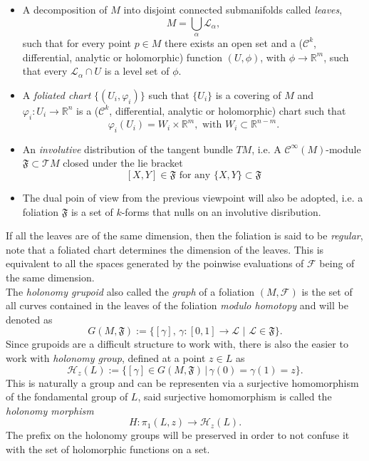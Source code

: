 \documentclass[12pt,twoside,a4paper]{report}
\newcommand{\re}{\ensuremath{\mathbb R }}
\begin{document}
\begin{itemize}
  \item A decomposition of $M$ into disjoint connected submanifolds called \emph{leaves},
        \[
          M=\bigcup_{\alpha}\mathcal{L_{\alpha}},
        \]
        \noindent such that for every point $p\in M$ there exists an open set and a ($\mathcal{C}^{k}$, differential, analytic or holomorphic) function $(U,\phi)$, with $\phi\rightarrow\re^{m}$, such that every $\mathcal{L}_{\alpha}\cap U$ is a level set of $\phi$.
  \item A \emph{foliated chart} $\{(U_{i},\varphi_{i})\}$ such that $\{U_{i}\}$ is a covering of $M$ and $\varphi_{i}:U_{i}\rightarrow\re^{n}$ is a ($\mathcal{C}^{k}$, differential, analytic or holomorphic) chart such that
        \[
          \varphi_{i}(U_{i})=W_{i}\times\re^{m},\text{ with }W_{i}\subset\re^{n-m}.
        \]
      \item An \emph{involutive} distribution of the tangent bundle $TM$, i.e. A $\mathcal{C}^{\infty}(M)$-module $\mathfrak{F}\subset\mathcal{T}M$ closed under the lie bracket
        \[
          [X,Y]\in\mathfrak{F}\text{ for any } \{X,Y\}\subset\mathfrak{F}
        \]
  \item The dual poin of view from the previous viewpoint will also be adopted, i.e. a foliation $\mathfrak{F}$ is a set of $k$-forms that nulls on an involutive disribution.
\end{itemize}
If all the leaves are of the same dimension, then the foliation is said to be \emph{regular}, note that a foliated chart determines the dimension of the leaves. This is equivalent to all the spaces generated by the poinwise evaluations of $\mathcal{F}$ being of the same dimension.\\

The \emph{holonomy grupoid} also called the \emph{graph} of a foliation $(M,\mathcal{F})$ is the set of all curves contained in the leaves of the foliation \textit{modulo homotopy} and will be denoted as 
\[
G(M,\mathfrak{F}):=\{[\gamma],\,\gamma:[0,1]\rightarrow\mathcal{L}\,\,\vert\,\,\mathcal{L}\in\mathfrak{F}\}.
\]
Since grupoids are a difficult structure to work with, there is also the easier to work with \emph{holonomy group}, defined at a point $z\in L$ as
\[
\mathcal{H}_z(L):=\{[\gamma]\in G(M,\mathfrak{F})\,|\,\gamma(0)=\gamma(1)=z\}.
\]
This is naturally a group and can be representen via a surjective homomorphism of the fondamental group of $L$, said surjective homomorphism is called the \emph{holonomy morphism}
\[
H:\pi_{1}(L,z)\rightarrow\mathcal{H}_z(L).
\]
The prefix on the holonomy groups will be preserved in order to not confuse it with the set of holomorphic functions on a set.
\end{document}
